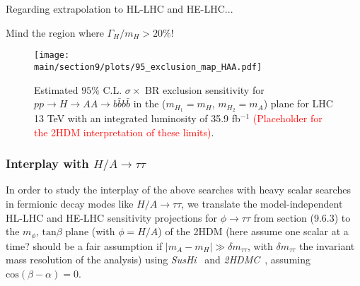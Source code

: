 \documentclass[../report.tex]{subfiles}
\providecommand{\main}{..}
\begin{document}
Regarding extrapolation to HL-LHC and HE-LHC...

Mind the region where $\Gamma_H/m_H > 20\%$!

\begin{figure}[h]
\begin{center}
\texttt{[image: \\main/section9/plots/95\_exclusion\_map\_HAA.pdf]}
\caption{\small Estimated $95\%$ C.L. $\sigma \times$ BR exclusion sensitivity for $p p \to H \to A A \to b \bar{b} b \bar{b}$ 
in the ($m_{H_1} = m_H$, $m_{H_2} = m_A$) plane for LHC 13 TeV with an integrated luminosity of 35.9 fb$^{-1}$ \textcolor{red}{(Placeholder for the 
2HDM interpretation of these limits)}.}
\label{Fig_HAA_2D_Limits}
\end{center}
\end{figure}


\subsubsection{Interplay with $H/A \to \tau\tau$}

In order to study the interplay of the above searches with heavy scalar searches in fermionic decay modes like $H/A \to \tau\tau$, 
we translate the model-independent HL-LHC and HE-LHC sensitivity projections for $\phi \to \tau\tau$ from section (9.6.3) 
to the $m_{\phi}$, $\mathrm{tan}\beta$ plane (with $\phi = H/A$) of the 2HDM (here assume one scalar at a time? should be a fair assumption if 
$|m_A - m_H| \gg \delta m_{\tau\tau}$, with $\delta m_{\tau\tau}$ the invariant mass resolution of the analysis)
using {\sl SusHi}~\cite{Harlander:2012pb} and {\sl 2HDMC}~\cite{Eriksson:2009ws}, assuming 
$\mathrm{cos}(\beta - \alpha) = 0$.







%
\end{document}
